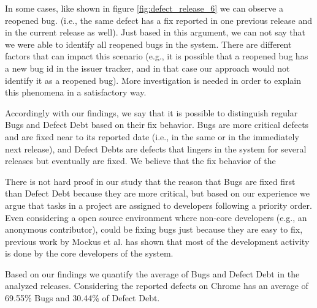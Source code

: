 In some cases, like shown in figure \ref{fig:defect_release_6} we can observe a reopened bug. (i.e., the same defect has a fix reported in one previous release and in the current release as well). Just based in this argument, we can not say that we were able to identify all reopened bugs in the system. There are different factors that can impact this scenario (e.g., it is possible that a reopened bug has a new bug id in the issuer tracker, and in that case our approach would not identify it as a reopened bug).  More investigation is needed in order to explain this phenomena in a satisfactory way. 

Accordingly with our findings, we say that it is possible to distinguish regular Bugs and Defect Debt based on their fix behavior. Bugs are more critical defects and are fixed near to its reported date (i.e., in the same or in the immediately next release), and Defect Debts are defects that lingers in the system for several releases but eventually are fixed. We believe that the fix behavior of the 

There is not hard proof in our study that the reason that Bugs are fixed first than Defect Debt because they are more critical, but based on our experience we argue that tasks in a project are assigned to developers following a priority order. Even considering a open source environment where non-core developers (e.g., an anonymous contributor), could be fixing bugs just because they are easy to fix, previous work by Mockus et al. \cite{mockus2010ICSM} has shown that most of the development activity is done by the core developers of the system.

Based on our findings we quantify the average of Bugs and Defect Debt in the analyzed releases. Considering the reported defects on Chrome has an average of 69.55\% Bugs and 30.44\% of Defect Debt.

\vspace{1mm}
\vspace{1mm}

